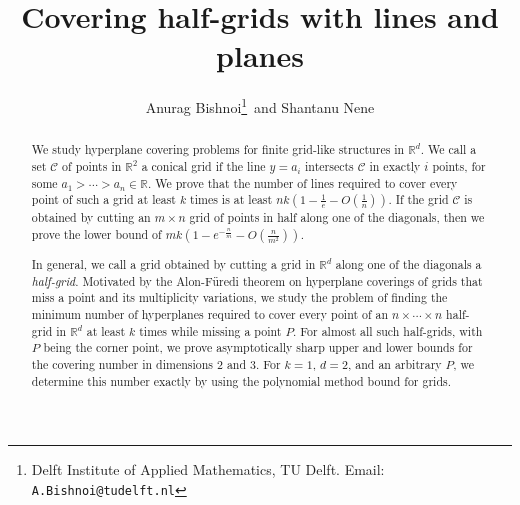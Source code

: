 \documentclass[usenames,dvipsnames, 11pt]{article}
\title{Covering half-grids with lines and planes}
\author{Anurag Bishnoi\thanks{Delft Institute of Applied Mathematics, TU Delft.
Email: \texttt{A.Bishnoi@tudelft.nl}} \,and 
Shantanu Nene}
\numberwithin{thm}{section}
\theoremstyle{definition}
\theoremstyle{definition}
\theoremstyle{definition}
\newcommand{\1}{\mathbf{1}}
\begin{document}
\maketitle

\begin{abstract}
    We study hyperplane covering problems for finite grid-like structures in $\mathbb{R}^d$.
    We call a set $\mathcal{C}$ of points in $\mathbb{R}^2$ a conical grid if the line $y = a_i$ intersects $\mathcal{C}$ in exactly $i$ points, for some $a_1 > \cdots > a_n \in \mathbb{R}$. 
    We prove that the number of lines required to cover every point of such a grid at least $k$ times is at least $nk\left(1-\frac{1}{e}-O(\frac{1}{n}) \right)$. 
    If the grid $\mathcal{C}$ is obtained by cutting an $m \times n$ grid of points in half along one of the diagonals, then we prove the lower bound of $mk\left(1-e^{-\frac{n}{m}}-O(\frac{n}{m^2})\right)$.
    
    In general, we call a grid obtained by cutting a grid in $\mathbb{R}^d$ along one of the diagonals a \textit{half-grid}.
    Motivated by the Alon-F\"uredi theorem on hyperplane coverings of grids that miss a point and its multiplicity variations, we study the problem of finding the minimum number of hyperplanes required to cover every point of an $n \times \cdots \times n$ half-grid in $\mathbb{R}^d$ at least $k$ times while missing a point $P$.
   For almost all such half-grids, with $P$ being the corner point, we prove asymptotically sharp upper and lower bounds for the covering number in dimensions $2$ and $3$.
   For $k = 1$, $d = 2$, and an arbitrary $P$, we determine this number exactly by using the polynomial method bound for grids.
\end{abstract}
\end{document}
